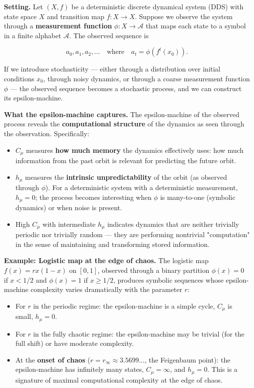 \textbf{Setting.} Let $(X, f)$ be a deterministic discrete dynamical system (DDS) with state space $X$ and transition map $f: X \to X$. Suppose we observe the system through a \textbf{measurement function} $\phi: X \to \mathcal{A}$ that maps each state to a symbol in a finite alphabet $\mathcal{A}$. The observed sequence is

\[
a_0, a_1, a_2, \ldots \quad \text{where} \quad a_t = \phi(f^t(x_0)).
\]

If we introduce stochasticity --- either through a distribution over initial conditions $x_0$, through noisy dynamics, or through a coarse measurement function $\phi$ --- the observed sequence becomes a stochastic process, and we can construct its epsilon-machine.

\textbf{What the epsilon-machine captures.} The epsilon-machine of the observed process reveals the \textbf{computational structure} of the dynamics as seen through the observation. Specifically:

\begin{itemize}
  \item $C_\mu$ measures \textbf{how much memory} the dynamics effectively uses: how much information from the past orbit is relevant for predicting the future orbit.
  \item $h_\mu$ measures the \textbf{intrinsic unpredictability} of the orbit (as observed through $\phi$). For a deterministic system with a deterministic measurement, $h_\mu = 0$; the process becomes interesting when $\phi$ is many-to-one (symbolic dynamics) or when noise is present.
  \item High $C_\mu$ with intermediate $h_\mu$ indicates dynamics that are neither trivially periodic nor trivially random --- they are performing nontrivial "computation" in the sense of maintaining and transforming stored information.
\end{itemize}

\textbf{Example: Logistic map at the edge of chaos.} The logistic map $f(x) = rx(1-x)$ on $[0,1]$, observed through a binary partition $\phi(x) = 0$ if $x < 1/2$ and $\phi(x) = 1$ if $x \geq 1/2$, produces symbolic sequences whose epsilon-machine complexity varies dramatically with the parameter $r$:

\begin{itemize}
  \item For $r$ in the periodic regime: the epsilon-machine is a simple cycle, $C_\mu$ is small, $h_\mu = 0$.
  \item For $r$ in the fully chaotic regime: the epsilon-machine may be trivial (for the full shift) or have moderate complexity.
  \item At the \textbf{onset of chaos} ($r = r_\infty \approx 3.5699\ldots$, the Feigenbaum point): the epsilon-machine has infinitely many states, $C_\mu = \infty$, and $h_\mu = 0$. This is a signature of maximal computational complexity at the edge of chaos.
\end{itemize}

